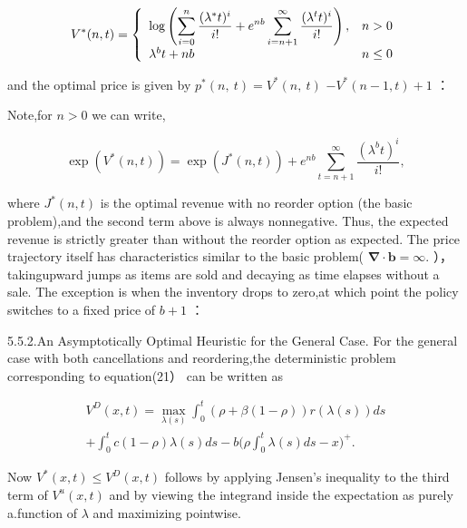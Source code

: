 \[
V ^ { * } ( n , t ) = \left\{ \begin{array} { l l } { \log \left( \displaystyle \sum _ { i = 0 } ^ { n } \frac { ( \lambda ^ { * } t ) ^ { i } } { i ! } + e ^ { n b } \displaystyle \sum _ { i = n + 1 } ^ { \infty } \frac { ( \lambda ^ { t } t ) ^ { i } } { i ! } \right) , } & { n > 0 } \\ { \lambda ^ { b } t + n b } & { n \leq 0 } \end{array} \right.
\]

and the optimal price is given by
\(p ^ { * } ( n , \ t ) = V ^ { * } ( n , \ t )\)
\(- V ^ { * } ( n - 1 , t ) + 1\) ：

Note,for \(n > 0\) we can write,

\[
\exp ( V ^ { * } ( n , t ) ) = \exp ( J ^ { * } ( n , t ) ) + e ^ { n b } \sum _ { t = n + 1 } ^ { \infty } \frac { ( \lambda ^ { b } t ) ^ { i } } { i ! } ,
\]

where \(J ^ { * } ( n , t )\) is the optimal revenue with no reorder
option (the basic problem),and the second term above is always
nonnegative. Thus, the expected revenue is strictly greater than without
the reorder option as expected. The price trajectory itself has
characteristics similar to the basic problem(
\(\mathbf { \nabla } \cdot \boldsymbol { b } = \infty .\)
），takingupward jumps as items are sold and decaying as time elapses
without a sale. The exception is when the inventory drops to zero,at
which point the policy switches to a fixed price of \(b + 1\) ：

5.5.2.An Asymptotically Optimal Heuristic for the General Case. For the
general case with both cancellations and reordering,the deterministic
problem corresponding to equation(21） can be written as

\[
\begin{array} { l } { \displaystyle { V ^ { D } ( x , t ) = \operatorname* { m a x } _ { \lambda ( s ) } \int _ { 0 } ^ { t } ( \rho + \beta ( 1 - \rho ) ) r ( \lambda ( s ) ) d s } } \\ { \displaystyle { + \int _ { 0 } ^ { t } c ( 1 - \rho ) \lambda ( s ) d s - b \Bigg ( \rho \int _ { 0 } ^ { t } \lambda ( s ) d s - x \Bigg ) ^ { + } . } } \end{array}
\]

Now \(V ^ { * } ( x , t ) \leq V ^ { D } ( x , t )\) follows by applying
Jensen's inequality to the third term of \(V ^ { u } ( x , t )\) and by
viewing the integrand inside the expectation as purely a.function of
\(\lambda\) and maximizing pointwise.

